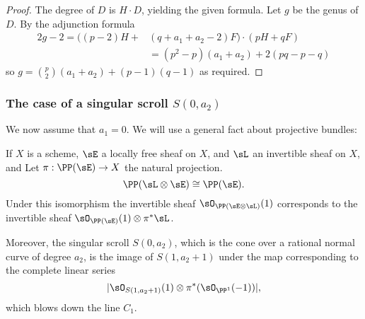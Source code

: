 \begin{proof} The degree of $D$ is $H\cdot D$, yielding the given formula. Let $g$ be the genus of $D$. 
By the adjunction formula
\begin{align*}
2g-2 =  \bigl((p-2)H+&(q+a_{1}+a_{2}-2)F\bigr)\cdot (pH+qF)\\ 
 &= (p^{2}-p)(a_{1}+a_{2})+2(pq-p-q)
\end{align*}
so $g = {p\choose 2}(a_{1}+a_{2}) + (p-1)(q-1)$ as required.
\end{proof}


\subsubsection{The case of a singular scroll $S(0,a_{2})$}


We now assume that $a_{1} = 0$. We will use a general fact about projective bundles:

\begin{proposition}\label{singular scrolls}
If $X$ is a scheme, $\sE$ a locally free sheaf on $X$, and $\sL$ an invertible sheaf on $X$, 
and Let $\pi: \PP(\sE)\to X$ the natural projection.
$$
\PP(\sL \otimes \sE)\cong \PP(\sE).
$$
Under this isomorphism the invertible sheaf $\sO_{\PP(\sE\otimes \sL)}(1)$ corresponds to the invertible sheaf
$\sO_{\PP(\sE)}(1)\otimes \pi^{*}\sL$. 

Moreover, the singular scroll $S(0,a_{2})$, which is the cone over a rational normal curve of degree $a_{2}$, is the image of
$S(1, a_{2}+1)$ under the map corresponding to the complete linear series 
$$
|\sO_{S(1, a_{2}+1)}(1) \otimes \pi^{*}(\sO_{\PP^{1}}(-1))|,
$$
which blows down the line $C_{1}$.
\end{proposition}

